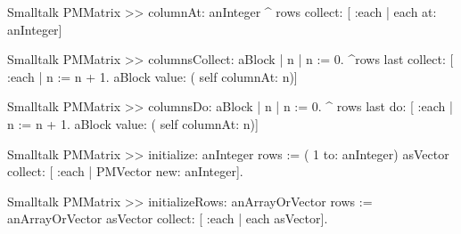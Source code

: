 \begin{displaycode}{Smalltalk}
PMMatrix >> columnAt: anInteger
    ^ rows collect: [ :each | each at: anInteger]
\end{displaycode}

\begin{displaycode}{Smalltalk}
PMMatrix >> columnsCollect: aBlock
    | n |
    n := 0.
    ^rows last collect: [ :each | n := n + 1. aBlock value: ( self 
                                                         columnAt: n)]
\end{displaycode}

\begin{displaycode}{Smalltalk}
PMMatrix >> columnsDo: aBlock
    | n |
    n := 0.
    ^ rows last do: [ :each | n := n + 1. aBlock value: ( self 
                                                         columnAt: n)]
\end{displaycode}

\begin{displaycode}{Smalltalk}
PMMatrix >> initialize: anInteger
    rows := ( 1 to: anInteger) asVector collect: [ :each | PMVector 
                                                      new: anInteger].
\end{displaycode}

\begin{displaycode}{Smalltalk}
PMMatrix >> initializeRows: anArrayOrVector
    rows := anArrayOrVector asVector collect: [ :each | each 
                                                            asVector].
\end{displaycode}

